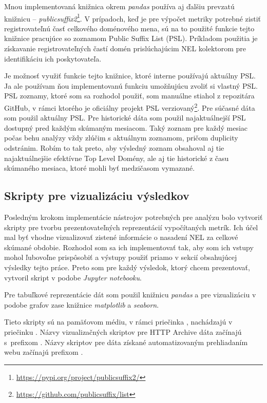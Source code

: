 Mnou implementovaná knižnica  okrem \textit{pandas} používa aj ďalšiu prevzatú knižnicu -- \textit{publicsuffix2}\footnote{\url{https://pypi.org/project/publicsuffix2/}}.
V prípadoch, keď je pre výpočet metriky potrebné zistiť registrovateľnú časť celkového doménového mena,
sú na to použité funkcie tejto knižnice pracujúce so zoznamom Public Suffix List (PSL). Príkladom použitia je získavanie registrovateľných častí domén prislúchajúcim NEL kolektorom pre identifikáciu ich poskytovateľa.

Je možnosť využiť funkcie tejto knižnice, ktoré interne používajú aktuálny PSL.
Ja ale používam ňou implementovanú funkciu umožňujúcu zvoliť si vlastný PSL.
PSL zoznamy, ktoré som sa rozhodol použiť, som manuálne stiahol z repozitára GitHub, v rámci ktorého je oficiálny projekt PSL verziovaný\footnote{\url{https://github.com/publicsuffix/list}}. 
Pre súčasné dáta som použil aktuálny PSL.
Pre historické dáta som použil najaktuálnejší PSL dostupný pred každým skúmaným mesiacom.
Taký zoznam pre každý mesiac počas behu analýzy vždy zlúčim s aktuálnym zoznamom, pričom duplicity odstránim.
Robím to tak preto, aby výsledný zoznam obsahoval aj tie najaktuálnejšie efektívne Top Level Domény, ale aj tie historické z času skúmaného mesiaca, ktoré mohli byť medzičasom vymazané.


\subsection{Skripty pre vizualizáciu výsledkov}
\label{visualize_results}

Posledným krokom implementácie nástrojov potrebných pre analýzu bolo vytvoriť skripty pre tvorbu prezentovateľných reprezentácií vypočítaných metrík.
Ich účel mal byť vhodne vizualizovať zistené informácie o nasadení NEL za celkové skúmané obdobie.
Rozhodol som sa ich implementovať tak, aby som ich vstupy mohol ľubovoľne prispôsobiť a výstupy použiť priamo v sekcií obsahujúcej výsledky tejto práce.
Preto som pre každý výsledok, ktorý chcem prezentovať, vytvoril skript v podobe \textit{Jupyter notebooku}.

Pre tabuľkové reprezentácie dát som použil knižnicu \textit{pandas} a pre vizualizáciu v podobe grafov zase knižnice \textit{matplotlib} a \textit{seaborn}.

Tieto skripty sú na pamäťovom médiu, v rámci priečinka , nachádzajú v priečinku .
Názvy vizualizačných skriptov pre HTTP Archive dáta začínajú \mbox{s prefixom} .
Názvy skriptov pre dáta získané automatizovaným prehliadaním webu začínajú prefixom .

